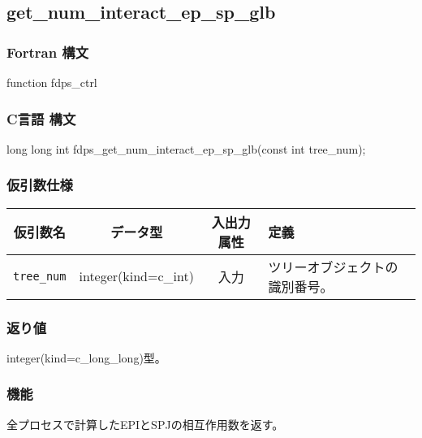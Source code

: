 \subsection{get\_num\_interact\_ep\_sp\_glb}
\subsubsection*{Fortran 構文}
\begin{screen}
\begin{spverbatim}
function fdps_ctrl%
\end{spverbatim}
\end{screen}

\subsubsection*{C言語 構文}
\begin{screen}
\begin{spverbatim}
long long int fdps_get_num_interact_ep_sp_glb(const int tree_num);
\end{spverbatim}
\end{screen}

\subsubsection*{仮引数仕様}
\begin{table}[h]
\begin{tabularx}{\linewidth}{cccX}
\toprule
\rowcolor{Snow2}
仮引数名 & データ型 & 入出力属性 & 定義 \\
\midrule
\verb|tree_num|  & integer(kind=c\_int)   & 入力     & ツリーオブジェクトの識別番号。\\
\bottomrule
\end{tabularx}
\end{table}

\subsubsection*{返り値}
integer(kind=c\_long\_long)型。

\subsubsection*{機能}
全プロセスで計算したEPIとSPJの相互作用数を返す。
\clearpage

